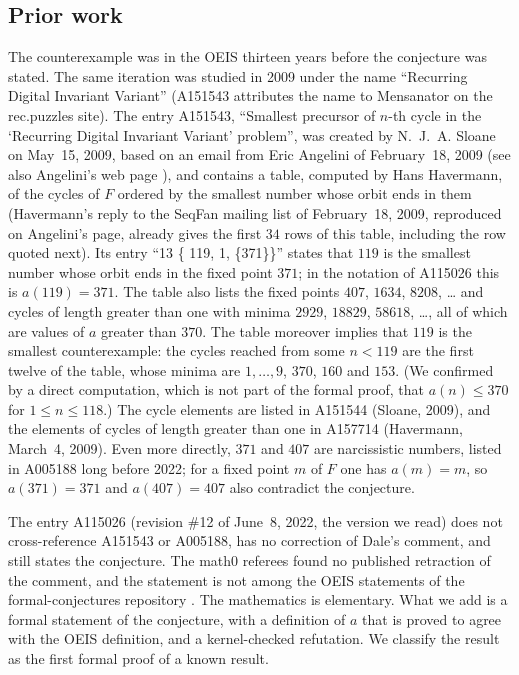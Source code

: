 \documentclass[11pt]{amsart}
\theoremstyle{plain}
\theoremstyle{definition}
\begin{document}
\subsection*{Prior work}
The counterexample was in the OEIS thirteen years before the conjecture was stated.
The same iteration was studied in 2009 under the name ``Recurring Digital Invariant Variant'' (A151543 \cite{A151543} attributes the name to Mensanator on the rec.puzzles site).
The entry A151543, ``Smallest precursor of $n$-th cycle in the `Recurring Digital Invariant Variant' problem'', was created by N.~J.~A. Sloane on May~15, 2009, based on an email from Eric Angelini of February~18, 2009 (see also Angelini's web page \cite{Angelini}), and contains a table, computed by Hans Havermann, of the cycles of $F$ ordered by the smallest number whose orbit ends in them (Havermann's reply to the SeqFan mailing list of February~18, 2009, reproduced on Angelini's page, already gives the first $34$ rows of this table, including the row quoted next).
Its entry ``13 \{ 119, 1, \{371\}\}'' states that $119$ is the smallest number whose orbit ends in the fixed point $371$; in the notation of A115026 this is $a(119)=371$.
The table also lists the fixed points $407$, $1634$, $8208$, \dots{} and cycles of length greater than one with minima $2929$, $18829$, $58618$, \dots, all of which are values of $a$ greater than $370$.
The table moreover implies that $119$ is the smallest counterexample: the cycles reached from some $n<119$ are the first twelve of the table, whose minima are $1,\dots,9$, $370$, $160$ and $153$.
(We confirmed by a direct computation, which is not part of the formal proof, that $a(n)\le370$ for $1\le n\le118$.)
The cycle elements are listed in A151544 \cite{A151544} (Sloane, 2009), and the elements of cycles of length greater than one in A157714 \cite{A157714} (Havermann, March~4, 2009).
Even more directly, $371$ and $407$ are narcissistic numbers, listed in A005188 \cite{A005188} long before 2022; for a fixed point $m$ of $F$ one has $a(m)=m$, so $a(371)=371$ and $a(407)=407$ also contradict the conjecture.

The entry A115026 (revision \#12 of June~8, 2022, the version we read) does not cross-reference A151543 or A005188, has no correction of Dale's comment, and still states the conjecture.
The math0 referees found no published retraction of the comment, and the statement is not among the OEIS statements of the formal-conjectures repository \cite{FC}.
The mathematics is elementary.
What we add is a formal statement of the conjecture, with a definition of $a$ that is proved to agree with the OEIS definition, and a kernel-checked refutation.
We classify the result as the first formal proof of a known result.
\end{document}
